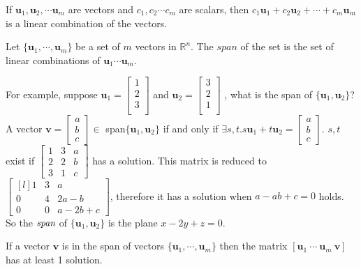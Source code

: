 \begin{definition}
If $\bm{u}_1, \bm{u}_2, \cdots \bm{u}_m$ are vectors and $c_1, c_2\cdots c_m$ are scalars, then
    $c_1\bm{u}_1+c_2\bm{u}_2+\cdots+c_m\bm{u}_m$
is a linear combination of the vectors.
\end{definition}

\begin{definition}[Span]
Let $\{\bm{u}_1,\cdots,\bm{u}_m\}$ be a set of $m$ vectors in $\mathbb{R}^n$. The $span$ of the set is the set of linear combinations of $\bm{u}_1\cdots\bm{u}_m$.
\end{definition}
For example, suppose
$\bm{u}_1=\begin{bmatrix}
1\\2\\3\\
\end{bmatrix}$
and
$\bm{u}_2=\begin{bmatrix}
3\\2\\1\\
\end{bmatrix}$
, what is the span of $\{\bm{u}_1, \bm{u}_2\}$?
A vector $\bm{v}=\begin{bmatrix}a\\b\\c\end{bmatrix}\in$ span$\{\bm{u}_1,\bm{u}_2\}$
if and only if $\exists s, t \bm{.} s\bm{u}_1 + t\bm{u}_2=\begin{bmatrix}a\\b\\c\end{bmatrix}$. $s, t$ exist if 
$
    \begin{bmatrix}
    1 & 3 & a\\
    2 & 2 & b\\
    3 & 1 & c
    \end{bmatrix}
$ has a solution. This matrix is reduced to $
    \begin{bmatrix*}[l]
    1 & 3 & a\\
    0 & 4 & 2a-b\\
    0 & 0 & a-2b+c
    \end{bmatrix*}
$, therefore it has a solution when $a-ab+c=0$ holds. So the $\emph{span}$ of $\{\bm{u}_1, \bm{u}_2\}$ is the plane $x-2y+z=0$. 

\begin{definition}
If a vector $\bm{v}$ is in the span of vectors $\{\bm{u}_1, \cdots, \bm{u}_m\}$ then the matrix $[\bm{u}_1\ \cdots\ \bm{u}_m \ \bm{v}]$ has at least 1 solution.
\end{definition}

